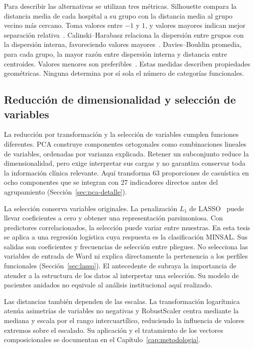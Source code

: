 Para describir las alternativas se utilizan tres métricas. Silhouette compara
la distancia media de cada hospital a su grupo con la distancia media al grupo
vecino más cercano. Toma valores entre $-1$ y $1$, y valores mayores indican
mejor separación relativa~\citep{Rousseeuw1987}. Calinski--Harabasz relaciona
la dispersión entre grupos con la dispersión interna, favoreciendo valores
mayores~\citep{CalinskiHarabasz1974}. Davies--Bouldin promedia, para cada
grupo, la mayor razón entre dispersión interna y distancia entre centroides.
Valores menores son preferibles~\citep{DaviesBouldin1979, Arbelaitz2013}.
Estas medidas describen propiedades geométricas. Ninguna determina por sí sola
el número de categorías funcionales.

\subsection{Reducción de dimensionalidad y selección de variables}
\label{sec:reduccion}

La reducción por transformación y la selección de variables cumplen funciones
diferentes. PCA construye componentes ortogonales como combinaciones lineales
de variables, ordenadas por varianza explicada. Retener un subconjunto reduce
la dimensionalidad, pero exige interpretar sus cargas y no garantiza conservar
toda la información clínica relevante. Aquí transforma 63 proporciones de
casuística en ocho componentes que se integran con 27 indicadores directos
antes del agrupamiento (Sección~\ref{sec:pca-detalle}).

La selección conserva variables originales. La penalización $L_1$ de
LASSO~\citep{Tibshirani1996} puede llevar coeficientes a cero y obtener una
representación parsimoniosa. Con predictores correlacionados, la selección
puede variar entre muestras. En esta tesis se aplica a una regresión logística
cuya respuesta es la clasificación MINSAL. Sus salidas son coeficientes y
frecuencias de selección entre pliegues. No selecciona las variables de entrada
de Ward ni explica directamente la pertenencia a los perfiles funcionales
(Sección~\ref{sec:lasso}). El antecedente de \citet{Bollmann2023} subraya
la importancia de atender a la estructura de los datos al interpretar una
selección. Su modelo de pacientes anidados no equivale al análisis
institucional aquí realizado.

Las distancias también dependen de las escalas. La transformación logarítmica
atenúa asimetrías de variables no negativas y RobustScaler centra mediante la
mediana y escala por el rango intercuartílico, reduciendo la influencia de
valores extremos sobre el escalado. Su aplicación y el tratamiento de los
vectores composicionales se documentan en el Capítulo~\ref{cap:metodologia}.

